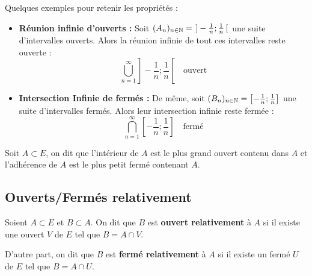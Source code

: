 \begin{example}
    Quelques exemples pour retenir les propriétés :
    \begin{itemize}
        \item \textbf{Réunion infinie d'ouverts : } Soit $(A_n)_{n \in \mathbb{N}} = \left. \right] -\frac{1}{n}; \frac{1}{n} \left[ \right. $ une suite d'intervalles ouverts. 
        Alors la réunion infinie de tout ces intervalles reste ouverte :
            \[ \bigcup_{n = 1}^\infty  \left. \right] -\frac{1}{n}; \frac{1}{n} \left[ \right.  \quad \text{ouvert}\] 
        \item \textbf{Intersection Infinie de fermés : } De même, soit $(B_n)_{n \in \mathbb{N}} =  \left[-\frac{1}{n}; \frac{1}{n} \right]$
        une suite d'intervalles fermés. Alors leur intersection infinie reste fermée :
            \[ \bigcap_{n = 1}^\infty  \left[-\frac{1}{n}; \frac{1}{n} \right] \quad \text{fermé}\]
    \end{itemize}
\end{example}

\begin{proposition}
    Soit $A \subset E$, on dit que l'intérieur de $A$ est le plus grand ouvert contenu dans $A$ et 
    l'adhérence de $A$ est le plus petit fermé contenant $A$. 
\end{proposition}


\subsection{Ouverts/Fermés relativement}

\begin{definition}
    Soient $A \subset E$ et $B \subset A$. On dit que $B$ est \textbf{ouvert relativement} à $A$ si il existe 
    une ouvert $V$ de $E$ tel que $B = A \cap V$. 

    D'autre part, on dit que $B$ est \textbf{fermé relativement} à $A$ si il existe un fermé 
    $U$ de $E$ tel que $B = A \cap U$. 
\end{definition}

